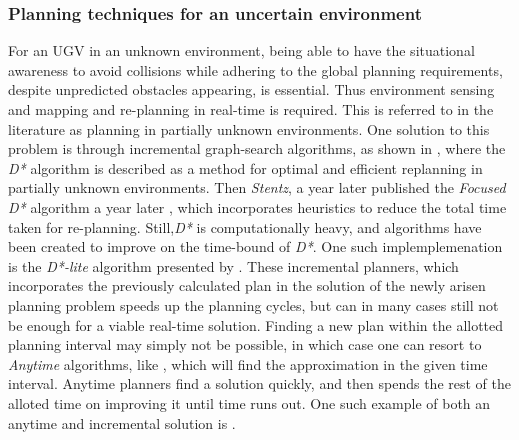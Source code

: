 \subsubsection{Planning techniques for an uncertain environment}
For an UGV in an unknown environment, being able to have the situational
awareness to avoid collisions while adhering to the global planning
requirements, despite unpredicted obstacles appearing, is essential. Thus
environment sensing and mapping and re-planning in real-time is required. This
is referred to in the literature as planning in partially unknown environments.
One solution to this problem is through incremental graph-search algorithms, as
shown in \cite[Stentz]{stentz_optimal}, where the \textsl{D*} algorithm is
described as a method for optimal and efficient replanning in partially unknown
environments. Then \textit{Stentz}, a year later published the \textit{Focused
  D*} algorithm a year later \cite{stentz1995focussed}, which incorporates
heuristics to reduce the total time taken for re-planning. Still,\textit{D*} is
computationally heavy, and algorithms have been created to improve on the
time-bound of \textit{D*}. One such implemplemenation is the \textit{D*-lite}
algorithm presented by \cite[Koenig]{koenig2002d}. These incremental planners,
which incorporates the previously calculated plan in the solution of the newly
arisen planning problem speeds up the planning cycles, but can in many cases
still not be enough for a viable real-time solution. Finding a new plan within
the allotted planning interval may simply not be possible, in which case one can
resort to \textit{Anytime} algorithms, like \cite[Karaman et.
al]{karamanAnytimeMotionPlanning2011}, which will find the approximation in the given time
interval. Anytime planners find a solution quickly, and then spends the rest of
the alloted time on improving it until time runs out. One such example of both
an anytime and incremental solution is \cite[Likachev]{likhachevAnytimeSearchDynamic2008}.

